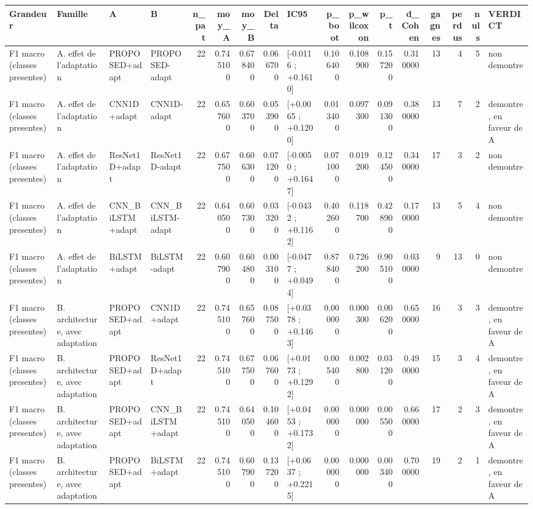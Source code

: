 \begin{tabular}{llllrrrrlrrrrrrrl}
\toprule
Grandeur & Famille & A & B & n_pat & moy_A & moy_B & Delta & IC95 & p_boot & p_wilcoxon & p_t & d_Cohen & gagnes & perdus & nuls & VERDICT \\
\midrule
F1 macro (classes presentes) & A. effet de l'adaptation & PROPOSED+adapt & PROPOSED-adapt & 22 & 0.745100 & 0.678400 & 0.066700 & [-0.0116 ; +0.1610] & 0.106400 & 0.108900 & 0.157200 & 0.310000 & 13 & 4 & 5 & non demontre \\
F1 macro (classes presentes) & A. effet de l'adaptation & CNN1D+adapt & CNN1D-adapt & 22 & 0.657600 & 0.603700 & 0.053900 & [+0.0065 ; +0.1200] & 0.013400 & 0.097300 & 0.091300 & 0.380000 & 13 & 7 & 2 & demontre, en faveur de A \\
F1 macro (classes presentes) & A. effet de l'adaptation & ResNet1D+adapt & ResNet1D-adapt & 22 & 0.677500 & 0.606300 & 0.071200 & [-0.0050 ; +0.1647] & 0.071000 & 0.019200 & 0.124500 & 0.340000 & 17 & 3 & 2 & non demontre \\
F1 macro (classes presentes) & A. effet de l'adaptation & CNN_BiLSTM+adapt & CNN_BiLSTM-adapt & 22 & 0.640500 & 0.607300 & 0.033200 & [-0.0432 ; +0.1162] & 0.402600 & 0.118700 & 0.428900 & 0.170000 & 13 & 5 & 4 & non demontre \\
F1 macro (classes presentes) & A. effet de l'adaptation & BiLSTM+adapt & BiLSTM-adapt & 22 & 0.607900 & 0.604800 & 0.003100 & [-0.0477 ; +0.0494] & 0.878400 & 0.726200 & 0.905100 & 0.030000 & 9 & 13 & 0 & non demontre \\
F1 macro (classes presentes) & B. architecture, avec adaptation & PROPOSED+adapt & CNN1D+adapt & 22 & 0.745100 & 0.657600 & 0.087500 & [+0.0378 ; +0.1463] & 0.000000 & 0.000300 & 0.006200 & 0.650000 & 16 & 3 & 3 & demontre, en faveur de A \\
F1 macro (classes presentes) & B. architecture, avec adaptation & PROPOSED+adapt & ResNet1D+adapt & 22 & 0.745100 & 0.677500 & 0.067600 & [+0.0173 ; +0.1292] & 0.005400 & 0.002800 & 0.031200 & 0.490000 & 15 & 3 & 4 & demontre, en faveur de A \\
F1 macro (classes presentes) & B. architecture, avec adaptation & PROPOSED+adapt & CNN_BiLSTM+adapt & 22 & 0.745100 & 0.640500 & 0.104600 & [+0.0453 ; +0.1732] & 0.000000 & 0.000000 & 0.005500 & 0.660000 & 17 & 2 & 3 & demontre, en faveur de A \\
F1 macro (classes presentes) & B. architecture, avec adaptation & PROPOSED+adapt & BiLSTM+adapt & 22 & 0.745100 & 0.607900 & 0.137200 & [+0.0637 ; +0.2215] & 0.000000 & 0.000000 & 0.003400 & 0.700000 & 19 & 2 & 1 & demontre, en faveur de A \\

\end{tabular}
